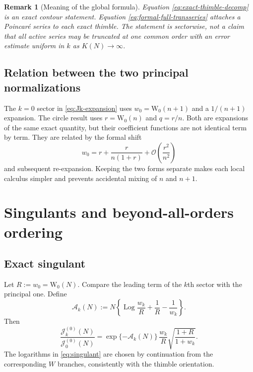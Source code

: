 \documentclass[11pt,a4paper]{article}
\newtheorem{remark}[theorem]{Remark}
\theoremstyle{definition}
\newcommand{\W}{\mathrm W}
\newcommand{\cA}{\mathcal A}
\newcommand{\cJ}{\mathcal J}
\newcommand{\Log}{\operatorname{Log}}
\newcommand{\bigO}{\mathcal O}
\begin{document}
\begin{remark}[Meaning of the global formula]
Equation \eqref{eq:exact-thimble-decomp} is an exact contour statement.
Equation \eqref{eq:formal-full-transseries} attaches a Poincar\'e series to each
exact thimble.  The statement is sectorwise, not a claim that all active
series may be truncated at one common order with an error estimate uniform in
$k$ as $K(N)\to\infty$.
\end{remark}

\subsection{Relation between the two principal normalizations}

The $k=0$ sector in \eqref{eq:Jk-expansion} uses
$w_0=\W_0(n+1)$ and a $1/(n+1)$ expansion.  The circle result uses
$r=\W_0(n)$ and $q=r/n$.  Both are expansions of the same exact quantity, but
their coefficient functions are not identical term by term.  They are related
by the formal shift
\begin{equation}\label{eq:w-r-shift}
 w_0=r+\frac{r}{n(1+r)}+\bigO\!\left(\frac{r^2}{n^2}\right)
\end{equation}
and subsequent re-expansion.  Keeping the two forms separate makes each local
calculus simpler and prevents accidental mixing of $n$ and $n+1$.

\section{Singulants and beyond-all-orders ordering}

\subsection{Exact singulant}

Let $R:=w_0=\W_0(N)$.  Compare the leading term of the $k$th sector with the
principal one.  Define
\begin{equation}\label{eq:singulant}
 \cA_k(N):=N\left\{
 \Log\frac{w_k}{R}+\frac1R-\frac1{w_k}
 \right\}.
\end{equation}
Then
\begin{equation}\label{eq:sector-ratio}
 \frac{\cJ_k^{(0)}(N)}{\cJ_0^{(0)}(N)}
 =\exp\{-\cA_k(N)\}\,
 \frac{w_k}{R}\sqrt{\frac{1+R}{1+w_k}}.
\end{equation}
The logarithms in \eqref{eq:singulant} are chosen by continuation from the
corresponding $W$ branches, consistently with the thimble orientation.
\end{document}
